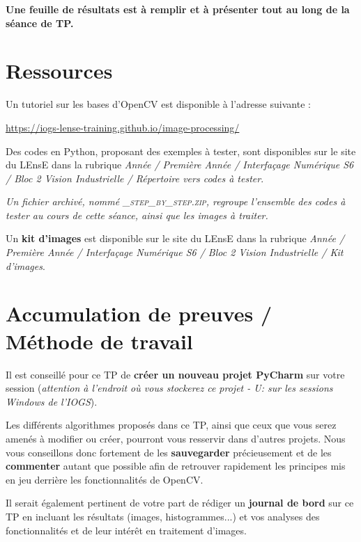 \bigskip

\textbf{Une feuille de résultats est à remplir et à présenter tout au long de la séance de TP.}

\section{Ressources}

Un tutoriel sur les bases d'OpenCV est disponible à l’adresse suivante : 

\href{https://iogs-lense-training.github.io/image-processing/}{https://iogs-lense-training.github.io/image-processing/}

Des {codes en Python}, proposant des exemples à tester, sont disponibles sur le site du LEnsE dans la rubrique \textit{Année / Première Année / Interfaçage Numérique S6 / Bloc 2 Vision Industrielle / Répertoire vers codes à tester}. 

\textit{Un fichier archivé, nommé \textsc{\_step\_by\_step.zip}, regroupe l'ensemble des codes à tester au cours de cette séance, ainsi que les images à traiter.}

\medskip

Un \textbf{kit d'images} est disponible sur le site du LEnsE dans la rubrique \textit{Année / Première Année / Interfaçage Numérique S6 / Bloc 2 Vision Industrielle / Kit d'images}. 


\section{Accumulation de preuves / Méthode de travail}

Il est conseillé pour ce TP de \textbf{créer un nouveau projet PyCharm} sur votre session (\textit{attention à l'endroit où vous stockerez ce projet - U: sur les sessions Windows de l'IOGS}).

Les différents algorithmes proposés dans ce TP, ainsi que ceux que vous serez amenés à modifier ou créer, pourront vous resservir dans d'autres projets. Nous vous conseillons donc fortement de les \textbf{sauvegarder} précieusement et de les \textbf{commenter} autant que possible afin de retrouver rapidement les principes mis en jeu derrière les fonctionnalités de OpenCV.

\medskip

Il serait également pertinent de votre part de rédiger un \textbf{journal de bord} sur ce TP en incluant les résultats (images, histogrammes...) et vos analyses des fonctionnalités et de leur intérêt en traitement d'images.


